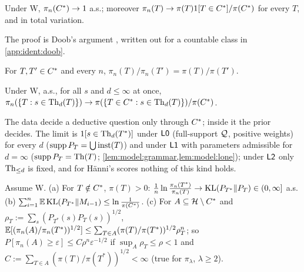 \begin{theorem}\identbrk{}\label{thm:ident:doob}
Under W, $\pi_n(C^{*})\to1$ a.s.; moreover $\pi_n(T)\to\pi(T)1[T\in C^{*}]/\pi(C^{*})$ for every $T$, and in total variation.
\end{theorem}

\noindent The proof is Doob's argument \citep{doob1949application}, written out for a countable class in \cref{app:ident:doob}.

\begin{corollary}\identbrk{}\label{cor:ident:prior}
For $T,T'\in C^{*}$ and every $n$, $\pi_n(T)/\pi_n(T')=\pi(T)/\pi(T')$.
\end{corollary}

\begin{corollary}\identbrk{}\label{cor:ident:deductive}
Under W, a.s., for all $s$ and $d\le\infty$ at once, $\pi_n(\{T:s\in\mathrm{Th}_d(T)\})\to\pi(\{T\in C^{*}:s\in\mathrm{Th}_d(T)\})/\pi(C^{*})$.
\end{corollary}

\noindent The data decide a deductive question only through $C^{*}$; inside it the prior decides. The limit is $1[s\in\mathrm{Th}_d(T^*)]$ under $\mathord{\mathsf{L0}}$ (full-support $\mathcal{Q}$, positive weights) for every $d$ ($\operatorname{supp}P_T=\bigcup\mathrm{inst}(T)$) and under $\mathord{\mathsf{L1}}$ with parameters admissible for $d=\infty$ ($\operatorname{supp}P_T=\mathrm{Th}(T)$; \cref{lem:model:grammar,lem:model:lone}); under $\mathord{\mathsf{L2}}$ only $\mathrm{Th}_{\le d}$ is fixed, and for H\"anni's scores nothing of this kind holds.

\begin{proposition}[Rates]\identbrk{}\label{prop:ident:rates}
Assume W. (a) For $T\notin C^{*}$, $\pi(T)>0$: $\frac1n\ln\frac{\pi_n(T^*)}{\pi_n(T)}\to\mathrm{KL}(P_{T^*}\|P_T)\in(0,\infty]$ a.s. (b) $\sum_{i=1}^n\mathbb{E}\,\mathrm{KL}(P_{T^*}\|M_{i-1})\le\ln\frac1{\pi(C^{*})}$. (c) For $A\subseteq\mathcal{H}\setminus C^{*}$ and $\rho_T:=\sum_s(P_{T^*}(s)P_T(s))^{1/2}$, $\mathbb{E}[(\pi_n(A)/\pi_n(T^*))^{1/2}]\le\sum_{T\in A}(\pi(T)/\pi(T^*))^{1/2}\rho_T^n$; so $P[\pi_n(A)\ge\varepsilon]\le C\rho^n\varepsilon^{-1/2}$ if $\sup_A\rho_T\le\rho<1$ and $C:=\sum_{T\in A}(\pi(T)/\pi(T^*))^{1/2}<\infty$ (true for $\pi_\lambda$, $\lambda\ge2$).
\end{proposition}

